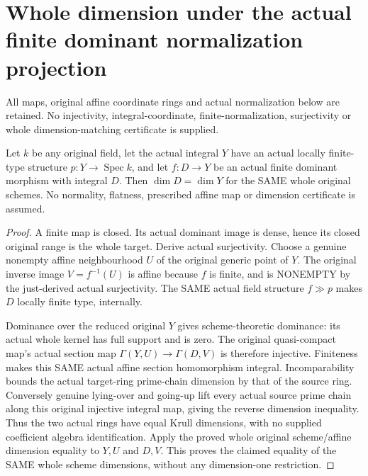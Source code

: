 \section{Whole dimension under the actual finite dominant normalization projection}
All maps, original affine coordinate rings and actual normalization below
are retained. No injectivity, integral-coordinate, finite-normalization,
surjectivity or whole dimension-matching certificate is supplied.

\begin{theorem}
\label{thm:pl-gauss-original-finite-dominant-whole-dimension}
\leanok
Let $k$ be any original field, let the actual integral $Y$ have an
actual locally finite-type structure $p:Y\to\operatorname{Spec}k$,
and let $f:D\to Y$ be an actual finite dominant morphism with
integral $D$. Then $\dim D=\dim Y$ for the SAME whole original schemes.
No normality, flatness, prescribed affine map or dimension certificate
is assumed.
\end{theorem}
\begin{proof}
A finite map is closed. Its actual dominant image is dense, hence its
closed original range is the whole target. Derive actual surjectivity.
Choose a genuine nonempty affine neighbourhood $U$ of the original
generic point of $Y$. The original inverse image $V=f^{-1}(U)$ is
affine because $f$ is finite, and is NONEMPTY by the just-derived
actual surjectivity. The SAME actual field structure $f\gg p$ makes
$D$ locally finite type, internally.

Dominance over the reduced original $Y$ gives scheme-theoretic
dominance: its actual whole kernel has full support and is zero.
The original quasi-compact map's actual section map
$\Gamma(Y,U)\to\Gamma(D,V)$ is therefore injective. Finiteness makes
this SAME actual affine section homomorphism integral. Incomparability
bounds the actual target-ring prime-chain dimension by that of the
source ring. Conversely genuine lying-over and going-up lift every
actual source prime chain along this original injective integral map,
giving the reverse dimension inequality. Thus the two actual rings
have equal Krull dimensions, with no supplied coefficient algebra
identification. Apply the proved whole original scheme/affine
dimension equality to $Y,U$ and $D,V$. This proves the claimed equality
of the SAME whole scheme dimensions, without any dimension-one restriction.
\end{proof}

